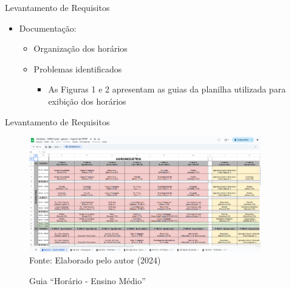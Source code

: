 \begin{frame}{Levantamento de Requisitos}
    \begin{itemize}
        \item Documentação: \vspace{0.5cm}
              \begin{itemize}
                  \item Organização dos horários \vspace{0.5cm}
                  \item Problemas identificados \vspace{0.5cm}
                  \begin{itemize}
                    \item As Figuras 1 e 2 apresentam as guias da planilha utilizada para exibição dos horários
                  \end{itemize}
              \end{itemize}
    \end{itemize}
\end{frame}

\begin{frame}{Levantamento de Requisitos}
    \begin{figure}
        \centering
        \vspace{-0.5cm}
        \caption{Guia ``Horário - Ensino Médio''}
        \vspace{-0.2cm}
        \includegraphics[width=0.9\textwidth]{figuras/plan-ant-1.png}
        \\ %
        \small Fonte: Elaborado pelo autor (2024)
    \end{figure}
\end{frame}

